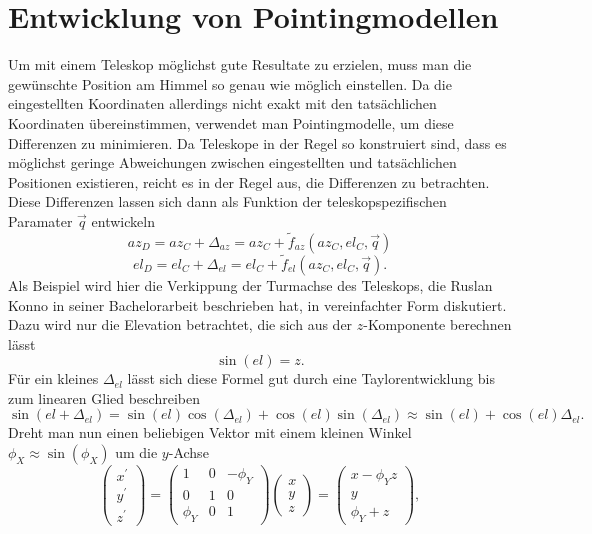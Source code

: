 \section{Entwicklung von Pointingmodellen}
Um mit einem Teleskop möglichst gute Resultate zu erzielen, muss man die gewünschte Position am Himmel so genau wie möglich einstellen. Da die eingestellten Koordinaten allerdings nicht exakt mit den tatsächlichen Koordinaten übereinstimmen, verwendet man Pointingmodelle, um diese Differenzen zu minimieren. Da Teleskope in der Regel so konstruiert sind, dass es möglichst geringe Abweichungen zwischen eingestellten und tatsächlichen Positionen existieren, reicht es in der Regel aus, die Differenzen zu betrachten. Diese Differenzen lassen sich dann als Funktion der teleskopspezifischen Paramater $\vec{q}$ entwickeln
\begin{equation}
az_D=az_C+\Delta_{az}=az_C+\tilde{f}_{az}\left(az_C,el_C,\vec{q}\right)
\label{eq:PointingZero-}
\end{equation}
\begin{equation}
el_D=el_C+\Delta_{el}=el_C+\tilde{f}_{el}\left(az_C,el_C,\vec{q}\right).
\label{eq:pointingZero}
\end{equation}
Als Beispiel wird hier die Verkippung der Turmachse des Teleskops, die Ruslan Konno in seiner Bachelorarbeit \cite{Ruslan} beschrieben hat, in vereinfachter Form diskutiert. Dazu wird nur die Elevation betrachtet, die sich aus der $z$-Komponente berechnen lässt
\begin{equation}
\sin(el)=z.
\end{equation}
Für ein kleines $\Delta_{el}$ lässt sich diese Formel gut durch eine Taylorentwicklung bis zum linearen Glied beschreiben
\begin{equation}
\sin(el+\Delta_{el})=\sin(el)\cos(\Delta_{el})+\cos(el)\sin(\Delta_{el})\approx \sin(el)+\cos(el)\Delta_{el}.
\label{eq:approx}
\end{equation}
Dreht man nun einen beliebigen Vektor mit einem kleinen Winkel $\phi_X \approx \sin(\phi_X)$ um die $y$-Achse
\begin{equation}
\left(\begin{array}{c}
x^{\prime}\\y^{\prime}\\z^{\prime}
\end{array}\right)=\left(\begin{array}{ccc}
1 & 0 & -\phi_Y\\0 & 1 & 0 \\\phi_Y & 0 & 1
\end{array}\right)\left(\begin{array}{c}
x\\y\\z
\end{array}\right)=\left(\begin{array}{c}
x-\phi_Yz\\y\\\phi_Y+z
\end{array}\right),
\end{equation}
